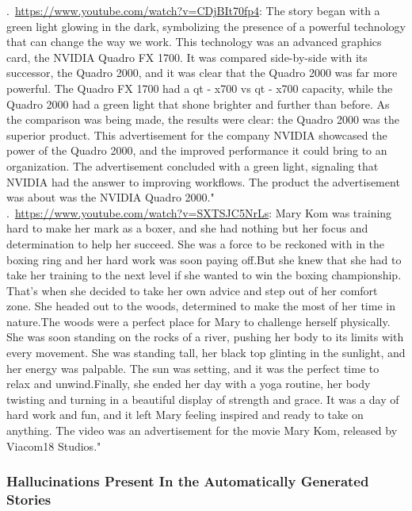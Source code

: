 \documentclass[hidelinks,11pt,a4paper]{report}
\begin{document}
    .~\url{https://www.youtube.com/watch?v=CDjBIt70fp4}: The story began with a green light glowing in the dark, symbolizing the presence of a powerful technology that can change the way we work. This technology was an advanced graphics card, the NVIDIA Quadro FX 1700. It was compared side-by-side with its successor, the Quadro 2000, and it was clear that the Quadro 2000 was far more powerful. The Quadro FX 1700 had a qt - x700 vs qt - x700 capacity, while the Quadro 2000 had a green light that shone brighter and further than before. As the comparison was being made, the results were clear: the Quadro 2000 was the superior product. This advertisement for the company NVIDIA showcased the power of the Quadro 2000, and the improved performance it could bring to an organization. The advertisement concluded with a green light, signaling that NVIDIA had the answer to improving workflows. The product the advertisement was about was the NVIDIA Quadro 2000." \\

    

    .~\url{https://www.youtube.com/watch?v=SXTSJC5NrLs}: Mary Kom was training hard to make her mark as a boxer, and she had nothing but her focus and determination to help her succeed. She was a force to be reckoned with in the boxing ring and her hard work was soon paying off.But she knew that she had to take her training to the next level if she wanted to win the boxing championship. That's when she decided to take her own advice and step out of her comfort zone. She headed out to the woods, determined to make the most of her time in nature.The woods were a perfect place for Mary to challenge herself physically. She was soon standing on the rocks of a river, pushing her body to its limits with every movement. She was standing tall, her black top glinting in the sunlight, and her energy was palpable. The sun was setting, and it was the perfect time to relax and unwind.Finally, she ended her day with a yoga routine, her body twisting and turning in a beautiful display of strength and grace. It was a day of hard work and fun, and it left Mary feeling inspired and ready to take on anything. The video was an advertisement for the movie Mary Kom, released by Viacom18 Studios." \\


\subsubsection{Hallucinations Present In the Automatically Generated Stories}
\end{document}
